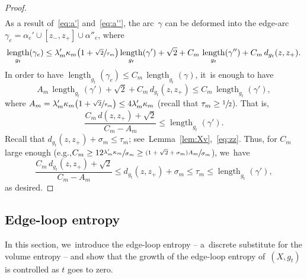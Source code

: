 \documentclass[11pt]{article}
\newcommand{\eg}{e.g.,\xspace}
\let\oldsfrac\sfrac
\renewcommand{\sfrac}[2]{{\oldsfrac{#1}{#2}}}
\theoremstyle{definition}
\DeclareMathOperator{\length}{length}
\numberwithin{equation}{section}
\begin{document}
\begin{proof}
\begin{equation}
\begin{aligned}
\end{aligned}
\end{equation}
As a result of~\eqref{eq:a'} and~\eqref{eq:a''}, the arc~$\gamma$ can be deformed into the edge-arc $\gamma_e = \alpha_e' \cup [z_-,z_+] \cup \alpha''_e$, where
\[
\length_{g_t}(\gamma_e) \leq \lambda'_m \kappa_m \bigl(1 + \sfrac{\sqrt{2}}{\tau_m} \bigr) \length_{g_t}(\gamma') + \sqrt{2} + C_m \, \length_{g_t}(\gamma'') + C_m \, d_{g_t}(z,z_+).
\]
In order to have $\length_{g_t}(\gamma_e) \leq C_m \, \length_{g_t}(\gamma)$, it~is enough to have
\[
A_m \, \length_{g_t}(\gamma') + \sqrt{2} + C_m \, d_{g_t}(z,z_+) \leq C_m \, \length_{g_t}(\gamma'),
\]
where $A_m = \lambda'_m \kappa_m \bigl(1 + \sfrac{\sqrt{2}}{\tau_m}\bigr) \leq 4 \lambda'_m \kappa_m$ (recall that $\tau_m \geq \sfrac{1}{2}$).
That is,
\[
\frac{C_m \, d(z,z_+) + \sqrt{2}}{C_m - A_m} \leq \length_{g_t}(\gamma').
\]
Recall that $d_{g_t}(z,z_+) + \sigma_m \leq \tau_m$; see~Lemma~\ref{lem:Xv},~\eqref{eq:zz}.
Thus, for $C_m$ large enough (\eg $C_m \geq 12 \sfrac{\lambda'_m \kappa_m}{\sigma_m} \geq \sfrac{(1+ \sqrt{2} +\sigma_m) A_m}{\sigma_m}$), we~have
\[
\frac{C_m \, d_{g_t}(z,z_+) + \sqrt{2}}{C_m - A_m} \leq d_{g_t}(z,z_+) + \sigma_m \leq \tau_m \leq \length_{g_t}(\gamma'),
\]
as desired.
\end{proof}

\subsection{Edge-loop entropy} \label{sec:edge-loop}

In this section, we~introduce the edge-loop entropy -- a~discrete substitute for the volume entropy -- and show that the growth of the edge-loop entropy of~$(X,g_t)$ is controlled as $t$ goes to zero.
\end{document}
